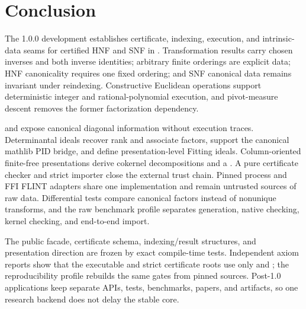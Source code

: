 \section{Conclusion}
\label{sec:conclusion}

The 1.0.0 development establishes certificate, indexing, execution, and
intrinsic-data seams for certified HNF and SNF in \Lean{}. Transformation
results carry chosen inverses and both inverse identities; arbitrary finite
orderings are explicit data; HNF canonicality requires one fixed ordering; and
SNF canonical data remains invariant under reindexing. Constructive Euclidean
operations support deterministic integer and rational-polynomial execution,
and pivot-measure descent removes the former factorization dependency.

 and  expose canonical diagonal
information without execution traces. Determinantal ideals recover rank and
associate factors, support the canonical mathlib PID bridge, and define
presentation-level Fitting ideals. Column-oriented finite-free presentations
derive cokernel decompositions and a . A pure
certificate checker and strict  importer close the external
trust chain. Pinned process and FFI FLINT adapters share one implementation and
remain untrusted sources of raw data. Differential tests compare canonical
factors instead of nonunique transforms, and the raw benchmark profile
separates generation, native checking, kernel checking, and end-to-end import.

The public facade, certificate schema, indexing/result structures, and
presentation direction are frozen by exact compile-time tests. Independent
axiom reports show that the executable and strict certificate roots use only
 and ; the reproducibility profile rebuilds the
same gates from pinned sources. Post-1.0 applications keep separate APIs,
tests, benchmarks, papers, and artifacts, so one research backend does not
delay the stable core.
